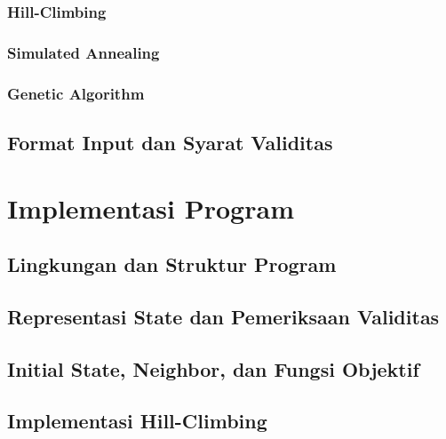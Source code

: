 \documentclass[11pt,a4paper]{article}
\begin{document}
\subsubsection{Hill-Climbing}
\par\pagebreak[0]

\subsubsection{Simulated Annealing}
\par\pagebreak[0]

\subsubsection{Genetic Algorithm}
\par\pagebreak[0]

\subsection{Format Input dan Syarat Validitas}
\par\pagebreak[0]


\section{Implementasi Program}
\par\pagebreak[0]

\subsection{Lingkungan dan Struktur Program}
\par\pagebreak[0]

\subsection{Representasi State dan Pemeriksaan Validitas}
\par\pagebreak[0]

\subsection{Initial State, Neighbor, dan Fungsi Objektif}
\par\pagebreak[0]

\subsection{Implementasi Hill-Climbing}
\par\pagebreak[0]
\end{document}
